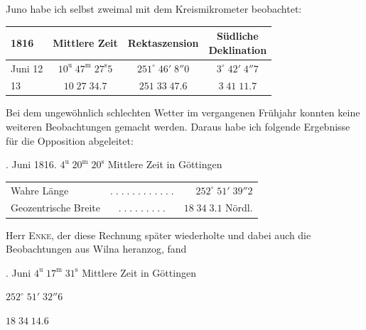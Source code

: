 \par\indent Juno habe ich selbst zweimal mit dem Kreismikrometer beobachtet:
\begin{center}\fontsize{10}{12}\selectfont\setlength{\tabcolsep}{5pt}\begin{tabular}{l|c|c|c}
1816 & Mittlere Zeit & Rektaszension & \shortstack{Südliche\\Deklination}\\\hline
Juni 12 & $10^{\mathrm u}\;47^{\mathrm m}\;27^{\mathrm s}5$ & $251^\circ\;46'\;8''0$ & $3^\circ\;42'\;4''7$\\
13 & $10\;27\;34.7$ & $251\;33\;47.6$ & $3\;41\;11.7$\\
\end{tabular}\end{center}

\par\indent Bei dem ungewöhnlich schlechten Wetter im vergangenen Frühjahr konnten keine weiteren Beobachtungen gemacht werden. Daraus habe ich folgende Ergebnisse für die Opposition abgeleitet:
\begin{center}\fontsize{10}{12}. Juni 1816. $4^{\mathrm u}\;20^{\mathrm m}\;20^{\mathrm s}$ Mittlere Zeit in Göttingen\par
\setlength{\tabcolsep}{3pt}\begin{tabular}{lcr}
Wahre Länge & $.\;.\;.\;.\;.\;.\;.\;.\;.\;.\;.\;.$ & $252^\circ\;51'\;39''2$\\
Geozentrische Breite & $.\;.\;.\;.\;.\;.\;.\;.\;.$ & $18\;34\;3.1$ Nördl.\\
\end{tabular}\end{center}

\par\indent Herr \textsc{Enke}, der diese Rechnung später wiederholte und dabei auch die Beobachtungen aus Wilna heranzog, fand
\begin{center}\fontsize{10}{12}. Juni \quad $4^{\mathrm u}\;17^{\mathrm m}\;31^{\mathrm s}$ \quad Mittlere Zeit in Göttingen\par
$252^\circ\;51'\;32''6$\par
$18\;34\;14.6$
\end{center}

